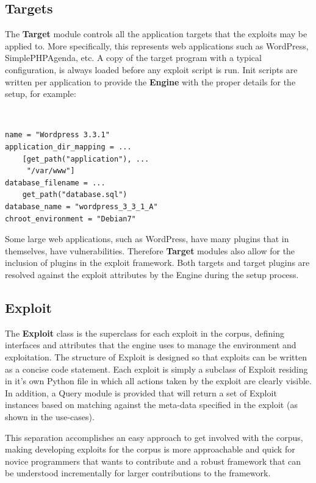 \documentclass[letterpaper,twocolumn,10pt]{article}
\begin{document}
\subsection{Targets}
   The {\bf Target} module controls all the application targets that the exploits may be applied to.  More specifically, this represents web applications such as WordPress, SimplePHPAgenda, etc. A copy of the target program with a typical configuration, is always loaded before any exploit script is run.  Init scripts are written per application to provide the {\bf Engine} with the proper details for the setup, for example:

\begin{minipage}{\textwidth}
{\tt \footnotesize
\begin{lstlisting}
name = "Wordpress 3.3.1"
application_dir_mapping = ...
    [get_path("application"), ...
     "/var/www"]
database_filename = ...
    get_path("database.sql")
database_name = "wordpress_3_3_1_A"
chroot_environment = "Debian7"
\end{lstlisting}
} 
\end{minipage}


Some large web applications, such as WordPress, have many plugins that in themselves, have vulnerabilities. Therefore {\bf Target} modules also allow for the inclusion of plugins in the exploit framework. Both targets and target plugins are resolved against the exploit attributes by the Engine during the setup process. 


\subsection{Exploit}
The {\bf Exploit} class is the superclass for each exploit in the corpus, defining interfaces and attributes that the engine uses to manage the environment and exploitation. The structure of Exploit is designed so that exploits can be written as a concise code statement. Each exploit is simply a subclass of Exploit residing in it's own Python file in which all actions taken by the exploit are clearly visible. In addition, a Query module is provided that will return a set of Exploit instances based on matching against the meta-data specified in the exploit (as shown in the use-cases).\par

This separation accomplishes an easy approach to get involved with the corpus, making developing exploits for the corpus is more approachable and quick for novice programmers that wants to contribute and a robust framework that can be understood incrementally for larger contributions to the framework.\par
 
\end{document}
